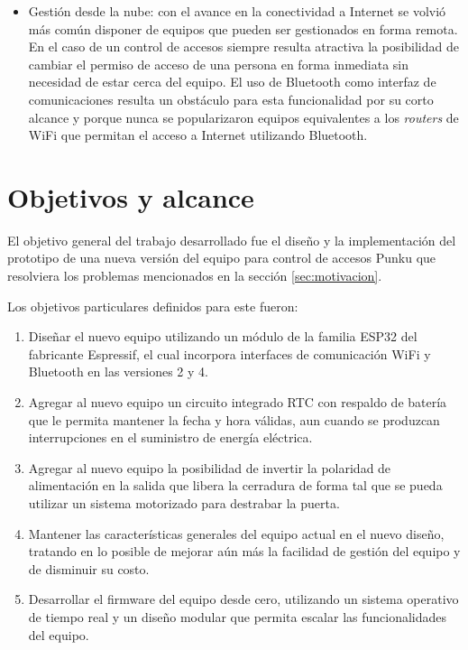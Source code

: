 \begin{itemize}
	\item Gestión desde la nube: con el avance en la conectividad a Internet se volvió más común disponer de equipos que pueden ser gestionados en forma remota. En el caso de un control de accesos siempre resulta atractiva la posibilidad de cambiar el permiso de acceso de una persona en forma inmediata sin necesidad de estar cerca del equipo. El uso de Bluetooth como interfaz de comunicaciones resulta un obstáculo para esta funcionalidad por su corto alcance y porque nunca se popularizaron equipos equivalentes a los \emph{routers} de WiFi que permitan el acceso a Internet utilizando Bluetooth.
\end{itemize}

\section{Objetivos y alcance}
\label{sec:objetivos}

El objetivo general del trabajo desarrollado fue el diseño y la implementación del prototipo de una nueva versión del equipo para control de accesos Punku que resolviera los problemas mencionados en la sección \ref{sec:motivacion}. 

Los objetivos particulares definidos para este fueron:

\begin{enumerate}
	\item Diseñar el nuevo equipo utilizando un módulo de la familia ESP32 \cite{noauthor_esp32_2019} del fabricante Espressif, el cual incorpora interfaces de comunicación WiFi y Bluetooth en las versiones 2 y 4.
	
	\item Agregar al nuevo equipo un circuito integrado RTC con respaldo de batería que le permita mantener la fecha y hora válidas, aun cuando se produzcan interrupciones en el suministro de energía eléctrica.
	
	\item Agregar al nuevo equipo la posibilidad de invertir la polaridad de alimentación en la salida que libera la cerradura de forma tal que se pueda utilizar un sistema motorizado para destrabar la puerta.
	
	\item Mantener las características generales del equipo actual en el nuevo diseño, tratando en lo posible de mejorar aún más la facilidad de gestión del equipo y de disminuir su costo.
	
	\item Desarrollar el firmware del equipo desde cero, utilizando un sistema operativo de tiempo real y un diseño modular que permita escalar las funcionalidades del equipo.
\end{enumerate}

